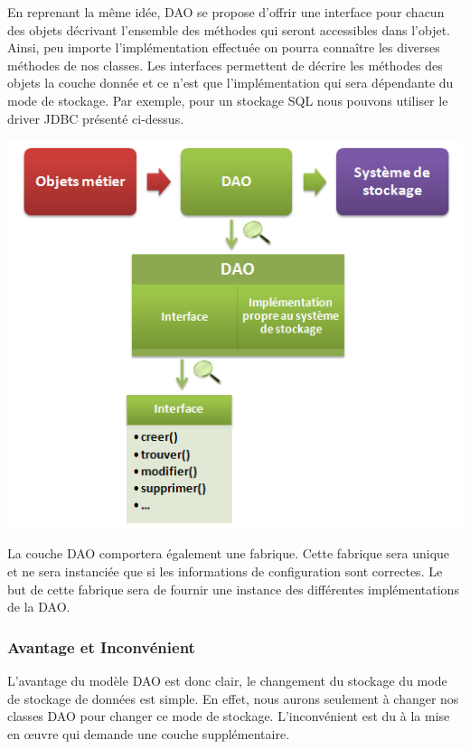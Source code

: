 En reprenant la même idée, DAO se propose d'offrir une interface pour chacun des objets décrivant l'ensemble des méthodes qui seront accessibles dans l'objet. Ainsi, peu importe l'implémentation effectuée on pourra connaître les diverses méthodes de nos classes. Les interfaces permettent de décrire les méthodes des objets la couche donnée et ce n'est que l'implémentation qui sera dépendante du mode de stockage. Par exemple, pour un stockage SQL nous pouvons utiliser le driver JDBC présenté ci-dessus.\\ 
\begin{center}
\includegraphics[scale=0.5]{../graph/dao2.png} \\
\end{center}

La couche DAO comportera également une fabrique. Cette fabrique sera unique et ne sera instanciée que si les informations de configuration sont correctes. Le but de cette fabrique sera de fournir une instance des différentes implémentations de la DAO.

\subsubsection{Avantage et Inconvénient}
L'avantage du modèle DAO est donc clair, le changement du stockage du mode de stockage de données est simple. En effet, nous aurons seulement à changer nos classes DAO pour changer ce mode de stockage. L'inconvénient est du à la mise en œuvre qui demande une couche supplémentaire. 


